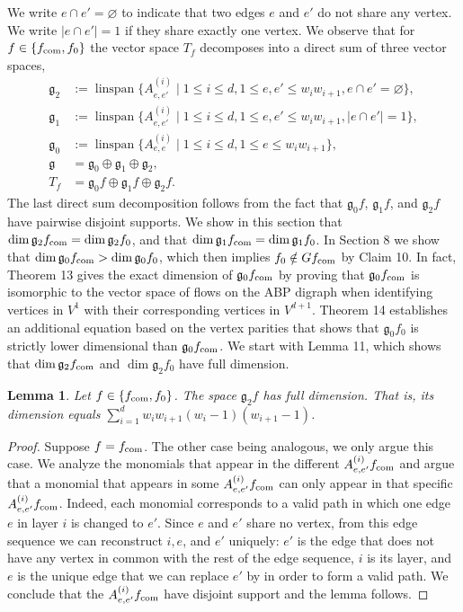 \documentclass[10pt,a4paper]{article}
\newtheorem{lemma}[theorem]{Lemma}
\newcommand{\fcom}{f_{\rm com}}
\newcommand{\g}{\mathfrak g}
\DeclareMathOperator{\linspan}{linspan}
\begin{document}
We write $e\cap e'=\varnothing$ to indicate that two edges $e$ and $e'$ do not share any vertex. We write $|e\cap e'|=1$ if they share exactly one vertex. We observe that for $f\in\{\fcom,f_0\}$ the vector space $T_f$ decomposes into a direct sum of three vector spaces,
\begin{align*}
\g_2&:=\linspan\{A^{(i)}_{e,e'}\mid1\le i\le d,1\le e,e'\le w_iw_{i+1},e\cap e'=\varnothing\},\\
\g_1&:=\linspan\{A^{(i)}_{e,e'}\mid1\le i\le d,1\le e,e'\le w_iw_{i+1},|e\cap e'|=1\},\\
\g_0&:=\linspan\{A^{(i)}_{e,e}\mid1\le i\le d,1\le e\le w_iw_{i+1}\},\\
\g&=\g_0\oplus\g_1\oplus\g_2,\\
T_f&=\g_0f\oplus\g_1f\oplus\g_2f.
\end{align*}
The last direct sum decomposition follows from the fact that $\g_0f$, $\g_1f$, and $\g_2f$ have pairwise disjoint supports.
We show in this section that $\dim\g_2\fcom=\dim\g_2f_0$, and that $\dim\g_1\fcom=\dim\g_1f_0$. In Section 8 we show that $\dim\g_0\fcom>\dim\g_0f_0$, which then implies $f_0\notin G\fcom$ by Claim 10. In fact, Theorem 13 gives the exact dimension of $\g_0\fcom$ by proving that $\g_0\fcom$ is isomorphic to the vector space of flows on the ABP digraph when identifying vertices in $V^1$ with their corresponding vertices in $V^{d+1}$. Theorem 14 establishes an additional equation based on the vertex parities that shows that $\g_0f_0$ is strictly lower dimensional than $\g_0\fcom$.
We start with Lemma 11, which shows that $\dim\g_2\fcom$ and $\dim\g_2f_0$ have full dimension.
\begin{lemma}
Let $f\in\{\fcom,f_0\}$. The space $\g_2f$ has full dimension. That is, its dimension equals $\sum_{i=1}^d w_iw_{i+1}(w_i-1)(w_{i+1}-1)$.
\end{lemma}
\begin{proof}
Suppose $f=\fcom$. The other case being analogous, we only argue this case.
We analyze the monomials that appear in the different $A^{(i)}_{e,e'}\fcom$ and argue that a monomial that appears in some $A^{(i)}_{e,e'}\fcom$ can only appear in that specific $A^{(i)}_{e,e'}\fcom$. Indeed, each monomial corresponds to a valid path in which one edge $e$ in layer $i$ is changed to $e'$. Since $e$ and $e'$ share no vertex, from this edge sequence we can reconstruct $i,e$, and $e'$ uniquely: $e'$ is the edge that does not have any vertex in common with the rest of the edge sequence, $i$ is its layer, and $e$ is the unique edge that we can replace $e'$ by in order to form a valid path. We conclude that the $A^{(i)}_{e,e'}\fcom$ have disjoint support and the lemma follows.
\end{proof}
\end{document}
